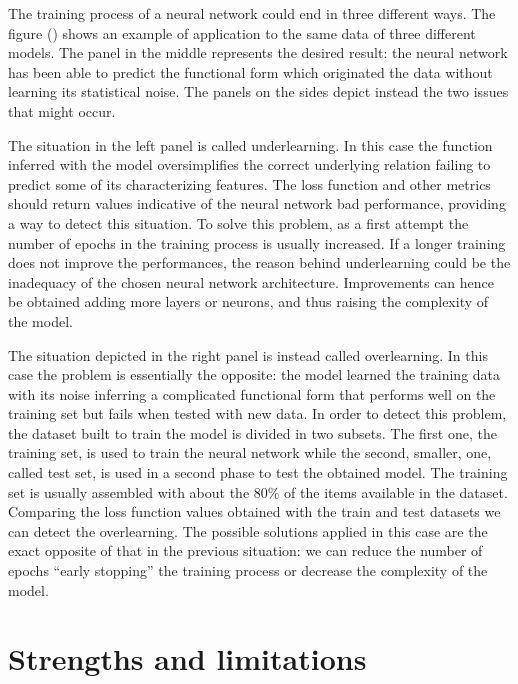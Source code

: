 \documentclass[a4paper,10pt]{report}
\begin{document}
The training process of a neural network could end in three different ways.
The figure () shows an example of application to the same data of three different models.
The panel in the middle represents the desired result: the neural network has been able to predict the 
functional form which originated the data without learning its statistical noise.
The panels on the sides depict instead the two issues that might occur.

The situation in the left panel is called underlearning. In this case the 
function inferred with the model oversimplifies the correct underlying relation failing 
to predict some of its characterizing features. The loss function and other metrics
should return values indicative of the neural network bad performance, providing
a way to detect this situation.
To solve this problem, as a first attempt the number of epochs in the training process is
usually increased. If a longer training does not improve the performances, the reason behind
underlearning could be the inadequacy of the chosen neural network architecture. 
Improvements can hence be obtained adding more layers or neurons, and thus raising the complexity of the model.

The situation depicted in the right panel is instead called overlearning.
In this case the problem is essentially the opposite: the model learned the training data
with its noise inferring a complicated functional form that performs
well on the training set but fails when tested with new data. In order to detect this problem,
the dataset built to train the model is divided in two subsets. The first one, the training set, is used to
train the neural network while the second, smaller, one, called test set, is used in a second phase to
test the obtained model. The training set is usually assembled with about the 80\% of the items available in the dataset.
Comparing the loss function values obtained with the train and test datasets we can
detect the overlearning. 
The possible solutions applied in this case are the exact opposite of that in the previous situation:
we can reduce the number of epochs ``early stopping'' the training process or decrease the complexity of
the model.

\section{Strengths and limitations}

\end{document}

